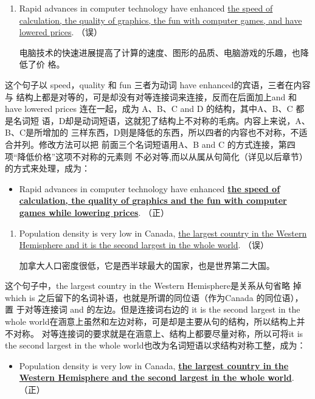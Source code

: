 \begin{enumerate}[resume]
\item Rapid advances in computer technology have enhanced \ul{the speed of
    calculation, the quality of graphics, the fun with computer games, and
    have lowered prices}. （误）

  电脑技术的快速进展提高了计算的速度、图形的品质、电脑游戏的乐趣，也降低了价
  格。
\end{enumerate}
这个句子以 speed，quality 和 fun 三者为动词 have enhanced的宾语，三者在内容与
结构上都是对等的，可是却没有对等连接词来连接，反而在后面加上and 和 have
lowered prices 连在一起，成为 A、B、C and D 的结构，其中A、B、C 都是名词短
语，D却是动词短语，这就犯了结构上不对称的毛病。内容上来说，A、B、C是所增加的
三样东西，D则是降低的东西，所以四者的内容也不对称，不适合并列。修改方法可以把
前面三个名词短语用A、B and C 的方式连接，第四项“降低价格”这项不对称的元素则
不必对等,而以从属从句简化（详见以后章节）的方式来处理，成为：
\begin{mybox}

\begin{itemize}
\item Rapid advances in computer technology have enhanced \ul{\textbf{the speed of
      calculation, the quality of graphics and the fun with computer games
      while lowering prices}}. （正）
\end{itemize}
\end{mybox}

\begin{enumerate}[resume]
\item Population density is very low in Canada, \ul{the largest country in the
  Western Hemisphere and it is the second largest in the whole world}. （误）

  加拿大人口密度很低，它是西半球最大的国家，也是世界第二大国。
\end{enumerate}
这个句子中，the largest country in the Western Hemisphere是关系从句省略
掉 which is 之后留下的名词补语，也就是所谓的同位语（作为Canada 的同位语），置
于对等连接词 and 的左边。但是连接词右边的 it is the second largest in the
whole world在涵意上虽然和左边对称，可是却是主要从句的结构，所以结构上并不对称。
对等连接词的要求就是在涵意上、结构上都要尽量对称，所以可将it is the second
largest in the whole world也改为名词短语以求结构对称工整，成为：
\begin{mybox}
\begin{itemize}
\item Population density is very low in Canada, \ul{\textbf{the largest country in
      the Western Hemisphere and the second largest in the whole
      world}}. （正）
\end{itemize}
\end{mybox}

